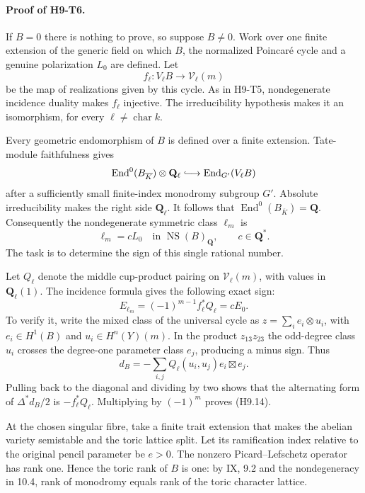 \paragraph{Proof of H9-T6.}
If $B=0$ there is nothing to prove, so suppose $B\ne0$. Work over one
finite extension of the generic field on which $B$, the normalized
Poincar\'e cycle and a genuine polarization $L_0$ are defined. Let
\[
 f_\ell:V_\ell B\longrightarrow\mathcal V_\ell(m)
\]
be the map of realizations given by this cycle. As in H9-T5,
nondegenerate incidence duality makes $f_\ell$ injective. The
irreducibility hypothesis makes it an isomorphism, for every
$\ell\ne\operatorname{char}k$.

Every geometric endomorphism of $B$ is defined over a finite extension.
Tate-module faithfulness gives
\[
 \operatorname{End}^0(B_{\overline K})\otimes\mathbf Q_\ell
   \lhook\joinrel\longrightarrow
 \operatorname{End}_{G'}(V_\ell B)
\]
after a sufficiently small finite-index monodromy subgroup $G'$.
Absolute irreducibility makes the right side $\mathbf Q_\ell$.
It follows that $\operatorname{End}^0(B_{\overline K})=\mathbf Q$.
Consequently the nondegenerate symmetric class $\ell_m$ is
\[
 \ell_m=c L_0\quad\text{in }\operatorname{NS}(B)_{\mathbf Q},
 \qquad c\in\mathbf Q^* .                              \tag{H9.13}
\]
The task is to determine the sign of this single rational number.

Let $Q_\ell$ denote the middle cup-product pairing on
$\mathcal V_\ell(m)$, with values in $\mathbf Q_\ell(1)$.
The incidence formula gives the following exact sign:
\[
 E_{\ell_m}=(-1)^{m-1}f_\ell^*Q_\ell=cE_0.            \tag{H9.14}
\]
To verify it, write the mixed class of the universal cycle as
$z=\sum_i e_i\otimes u_i$, with $e_i\in H^1(B)$ and
$u_i\in H^n(Y)(m)$. In the product $z_{13}z_{23}$ the odd-degree
class $u_i$ crosses the degree-one parameter class $e_j$, producing
a minus sign. Thus
\[
 d_B=-\sum_{i,j}Q_\ell(u_i,u_j)e_i\boxtimes e_j.
\]
Pulling back to the diagonal and dividing by two shows that the
alternating form of $\Delta^*d_B/2$ is $-f_\ell^*Q_\ell$.
Multiplying by $(-1)^m$ proves (H9.14).

At the chosen singular fibre, take a finite trait extension that makes
the abelian variety semistable and the toric lattice split. Let its
ramification index relative to the original pencil parameter be $e>0$.
The nonzero Picard--Lefschetz operator has rank one. Hence the toric rank
of $B$ is one: by IX, 9.2 and the nondegeneracy in 10.4, rank of monodromy
equals rank of the toric character lattice.


